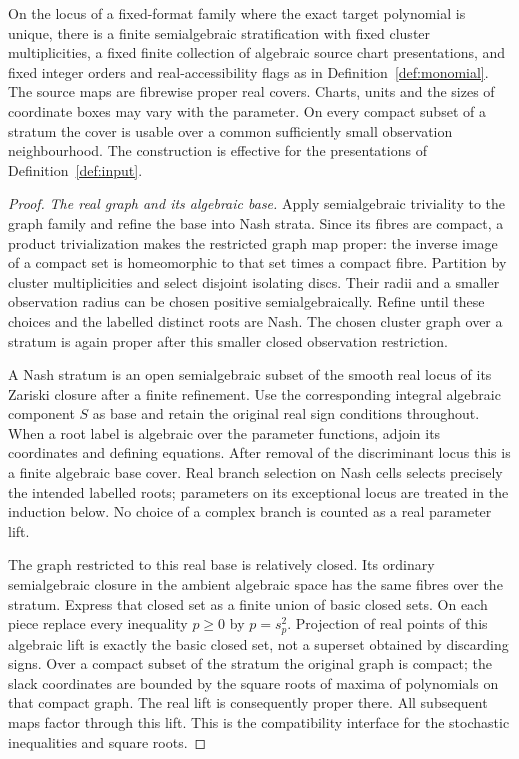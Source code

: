 \begin{theorem}\label{lem:relative}
On the locus of a fixed-format family where the exact target polynomial
is unique, there is a finite semialgebraic stratification with fixed
cluster multiplicities, a fixed finite collection of algebraic source
chart presentations, and fixed integer orders and real-accessibility
flags as in Definition~\ref{def:monomial}. The source maps are fibrewise
proper real covers. Charts, units and the sizes of coordinate boxes may
vary with the parameter. On every compact subset of a stratum the cover
is usable over a common sufficiently small observation neighbourhood.
The construction is effective for the presentations of
Definition~\ref{def:input}.
\end{theorem}
\begin{proof}
\emph{The real graph and its algebraic base.}
Apply semialgebraic triviality to the graph family and refine the base
into Nash strata. Since its fibres are compact, a product trivialization
makes the restricted graph map proper: the inverse image of a compact
set is homeomorphic to that set times a compact fibre. Partition by
cluster multiplicities and select disjoint isolating discs. Their radii
and a smaller observation radius can be chosen positive semialgebraically.
Refine until these choices and the labelled distinct roots are Nash.
The chosen cluster graph over a stratum is again proper after this
smaller closed observation restriction.

A Nash stratum is an open semialgebraic subset of the smooth real locus
of its Zariski closure after a finite refinement. Use the corresponding
integral algebraic component $S$ as base and retain the original real
sign conditions throughout. When a root label is algebraic over the
parameter functions, adjoin its coordinates and defining equations.
After removal of the discriminant locus this is a finite algebraic base
cover. Real branch selection on Nash cells selects precisely the intended
labelled roots; parameters on its exceptional locus are treated in the
induction below. No choice of a complex branch is counted as a real
parameter lift.

The graph restricted to this real base is relatively closed. Its
ordinary semialgebraic closure in the ambient algebraic space has the
same fibres over the stratum. Express that closed set as a finite union
of basic closed sets. On each piece replace every inequality $p\ge0$
by $p=s_p^2$. Projection of real points of this algebraic lift is exactly
the basic closed set, not a superset obtained by discarding signs.
Over a compact subset of the stratum the original graph is compact;
the slack coordinates are bounded by the square roots of maxima of
polynomials on that compact graph. The real lift is consequently proper
there. All subsequent maps factor through this lift. This is the
compatibility interface for the stochastic inequalities and square roots.


\end{proof}
